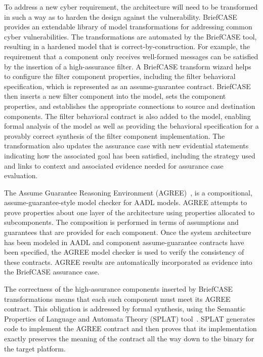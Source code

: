 To address a new cyber requirement, the architecture will need to be transformed in such a way as to harden the design against the vulnerability. BriefCASE provides an extendable library of model transformations for addressing common cyber vulnerabilities. 
The transformations are automated by the BriefCASE tool, resulting in a hardened model that is correct-by-construction. 
For example, the requirement that a component only receives well-formed messages can be satisfied by the insertion of a high-assurance filter. A BriefCASE transform wizard helps to configure the filter component properties, including the filter behavioral specification, which is represented as an assume-guarantee contract. BriefCASE then inserts a new filter component into the model, sets the component properties, and establishes the appropriate connections to source and destination components. The filter behavioral contract is also added to the model, enabling formal analysis of the model as well as providing the behavioral specification for a provably correct synthesis of the filter component implementation. 
The transformation also updates the assurance case with new evidential statements indicating how the associated goal has been satisfied, including the strategy used and links to context and associated evidence needed for assurance case evaluation.

The Assume Guarantee Reasoning Environment (AGREE)~\cite{compositional-analysis-agree}, is a compositional, assume-guarantee-style model checker for AADL models. AGREE attempts to prove properties about one layer of the architecture using properties allocated to subcomponents. The composition is performed in terms of assumptions and guarantees that are provided for each component.  
Once the system architecture has been modeled in AADL and component assume-guarantee contracts have been specified, the AGREE model checker is used to verify the consistency of these contracts.
AGREE results are automatically incorporated as evidence into the BriefCASE assurance case.

The correctness of the high-assurance components inserted by BriefCASE transformations means that each such component must meet its AGREE contract. This obligation is addressed by formal synthesis, using the Semantic Properties of Language and Automata Theory (SPLAT) tool~\cite{case-models-2021}. SPLAT generates code to implement the AGREE contract and then proves that its implementation exactly preserves the meaning of the contract all the way down to the binary for the target platform.

